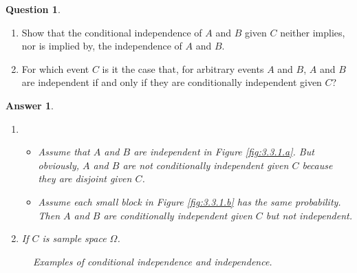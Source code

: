 \documentclass[utf8]{article}
\theoremstyle{definition}%
\newtheorem{question}{Question} %
\theoremstyle{plain}%
\newtheorem{answer}{Answer} %
\begin{document}
\begin{question} ~
    \begin{enumerate}[label=(\alph*)]
        \item Show that the conditional independence of $A$ and $B$ given $C$ neither implies, nor is implied by, the independence of $A$ and $B$.
        \item For which event $C$ is it the case that, for arbitrary events $A$ and $B$, $A$ and $B$ are independent if and only if they are conditionally independent given $C$?
    \end{enumerate}
\end{question}
\begin{answer} ~
    \begin{enumerate}[label=(\alph*)]
        \item 
            \begin{itemize}
                \item Assume that $A$ and $B$ are independent in Figure \ref{fig:3.3.1.a}. But obviously, $A$ and $B$ are not conditionally independent given $C$ because they are disjoint given $C$.
                \item Assume each small block in Figure \ref{fig:3.3.1.b} has the same probability. Then $A$ and $B$ are conditionally independent given $C$ but not independent.
            \end{itemize}
        \item If $C$ is sample space $\Omega$.
    \end{enumerate}
    \begin{figure}[H]
        \centering
        \quad
        \caption{Examples of conditional independence and independence.}
        \label{fig:3.3.1}
    \end{figure}
\end{answer}
\end{document}
